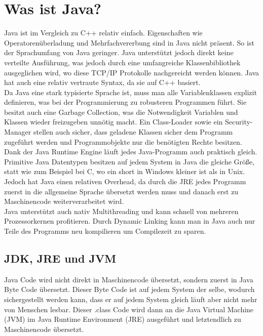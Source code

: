 \documentclass{article}
\begin{document}
	\section{Was ist Java?}
	Java ist im Vergleich zu C++ relativ einfach. Eigenschaften wie Operatorenüberladung und Mehrfachvererbung sind in Java nicht präsent. So ist der Sprachumfang von Java geringer. Java unterstützt jedoch direkt keine verteilte Ausführung, was jedoch durch eine umfangreiche Klassenbibliothek ausgeglichen wird, wo diese TCP/IP Protokolle nachgereicht werden können. Java hat auch eine relativ vertraute Syntax, da sie auf C++ basiert. \\
	Da Java eine stark typisierte Sprache ist, muss man alle Variablenklassen explizit definieren, was bei der Programmierung zu robusteren Programmen führt. Sie besitzt auch eine Garbage Collection, was die Notwendigkeit Variablen und Klassen wieder freizugeben unnötig macht. Ein Class-Loader sowie ein Security-Manager stellen auch sicher, dass geladene Klassen sicher dem Programm zugeführt werden und Programmobjekte nur die benötigten Rechte besitzen. Dank der Java Runtime Engine läuft jedes Java-Programm auch praktisch gleich.\\
	Primitive Java Datentypen besitzen auf jedem System in Java die gleiche Größe, statt wie zum Beispiel bei C, wo ein short in Windows kleiner ist als in Unix. \\
	Jedoch hat Java einen relativen Overhead, da durch die JRE jedes Programm zuerst in die allgemeine Sprache übersetzt werden muss und danach erst zu Maschinencode weiterverarbeitet wird. \\
	Java unterstützt auch nativ Multithreading und kann schnell von mehreren Prozessorkernen profitieren. Durch Dynamic Linking kann man in Java auch nur Teile des Programms neu kompilieren um Compilezeit zu sparen. \\
	\subsection{JDK, JRE und JVM}
	Java Code wird nicht direkt in Maschinencode übersetzt, sondern zuerst in Java Byte Code übersetzt. Dieser Byte Code ist auf jedem System der selbe, wodurch sichergestellt werden kann, dass er auf jedem System gleich läuft aber nicht mehr von Menschen lesbar. Dieser .class Code wird dann an die Java Virtual Machine (JVM) im Java Runtime Environment (JRE) ausgeführt und letztendlich zu Maschinencode übersetzt. \\
\end{document}
